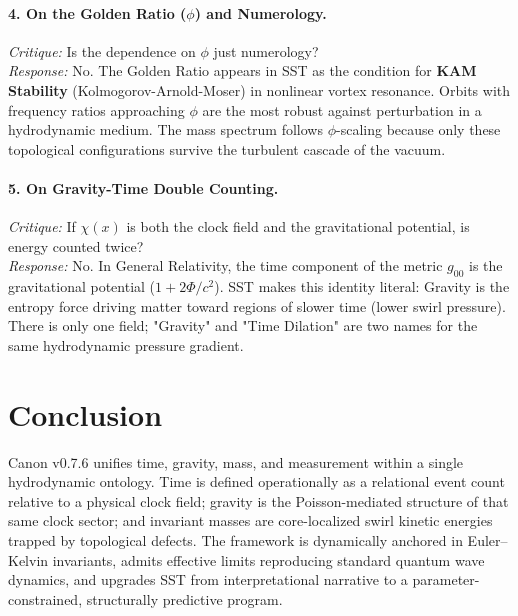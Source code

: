 \documentclass[10pt]{article}
\begin{document}
\paragraph{4. On the Golden Ratio ($\phi$) and Numerology.}
\textit{Critique:} Is the dependence on $\phi$ just numerology? \\
\textit{Response:} No. The Golden Ratio appears in SST as the condition for \textbf{KAM Stability} (Kolmogorov-Arnold-Moser) in nonlinear vortex resonance. Orbits with frequency ratios approaching $\phi$ are the most robust against perturbation in a hydrodynamic medium. The mass spectrum follows $\phi$-scaling because only these topological configurations survive the turbulent cascade of the vacuum.

\paragraph{5. On Gravity-Time Double Counting.}
\textit{Critique:} If $\chi(x)$ is both the clock field and the gravitational potential, is energy counted twice? \\
\textit{Response:} No. In General Relativity, the time component of the metric $g_{00}$ is the gravitational potential ($1+2\Phi/c^2$). SST makes this identity literal: Gravity is the entropy force driving matter toward regions of slower time (lower swirl pressure). There is only one field; "Gravity" and "Time Dilation" are two names for the same hydrodynamic pressure gradient.


    \section{Conclusion}
    \label{sec:conclusion}

    Canon v0.7.6 unifies time, gravity, mass, and measurement within a single
    hydrodynamic ontology. Time is defined operationally as a relational event count
    relative to a physical clock field; gravity is the Poisson-mediated structure of
    that same clock sector; and invariant masses are core-localized swirl kinetic
    energies trapped by topological defects. The framework is dynamically anchored
    in Euler--Kelvin invariants, admits effective limits reproducing standard quantum
    wave dynamics, and upgrades SST from interpretational narrative to a
    parameter-constrained, structurally predictive program.
\end{document}
